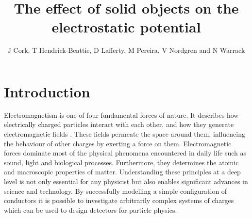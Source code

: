 \documentclass[a4paper]{jpconf}
\begin{document}
\title{The effect of solid objects on the electrostatic potential}
\author{J Cork, T  Hendrick-Beattie, D Lafferty, M Pereira, V Nordgren and N Warrack}
\address{School of Physics and Astronomy, University of Glasgow, Glasgow, UK}

\begin{abstract}
\end{abstract}

\section*{Introduction}
Electromagnetism is one of four fundamental forces of nature. It describes how electrically charged particles interact with each other, and how they generate electromagnetic fields \cite{Sears.Zamansky-uniPhy}. These fields permeate the space around them, influencing the behaviour of other charges by exerting a force on them. %
Electromagnetic forces dominate most of the physical phenomena encountered in daily life such as sound, light and biological processes. Furthermore, they determines the atomic and macroscopic properties of matter. Understanding these principles at a deep level is not only essential for any physicist but also enables significant advances in science and technology. By successfully modelling a simple configuration of conductors it is possible to investigate arbitrarily complex systems of charges which can be used to design detectors for particle physics. 


\end{document}
